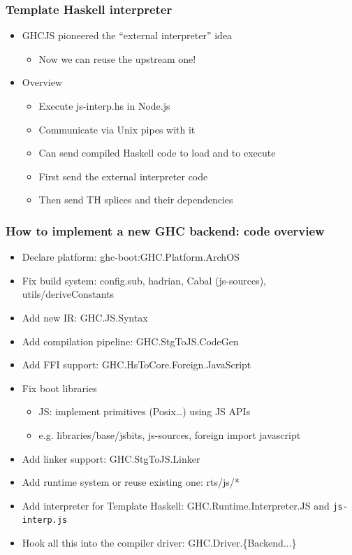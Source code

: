 \documentclass[aspectratio=169]{beamer}
\begin{document}
\begin{frame}
\frametitle{Template Haskell interpreter}
  \begin{itemize}
    \item GHCJS pioneered the “external interpreter” idea
      \begin{itemize}
        \item Now we can reuse the upstream one!
      \end{itemize}
    \item Overview
      \begin{itemize}
    \item Execute js-interp.hs in Node.js
    \item Communicate via Unix pipes with it
    \item Can send compiled Haskell code to load and to execute
    \item First send the external interpreter code
    \item Then send TH splices and their dependencies
      \end{itemize}
  \end{itemize}
\end{frame}

\begin{frame}
  \frametitle{How to implement a new GHC backend: code overview}
  \begin{itemize}
\item Declare platform: ghc-boot:GHC.Platform.ArchOS
\item Fix build system: config.sub, hadrian, Cabal (js-sources),
  utils/deriveConstants
\item Add new IR: GHC.JS.Syntax
\item Add compilation pipeline: GHC.StgToJS.CodeGen
\item Add FFI support: GHC.HsToCore.Foreign.JavaScript
\item Fix boot libraries
  \begin{itemize}
\item JS: implement primitives (Posix…) using JS APIs
\item e.g. libraries/base/jsbits, js-sources, foreign import javascript
  \end{itemize}
\item Add linker support: GHC.StgToJS.Linker
\item Add runtime system or reuse existing one: rts/js/*
\item Add interpreter for Template Haskell: GHC.Runtime.Interpreter.JS and
  \texttt{js-interp.js}
\item Hook all this into the compiler driver: GHC.Driver.\{Backend...\}
\end{itemize}
\end{frame}
\end{document}
